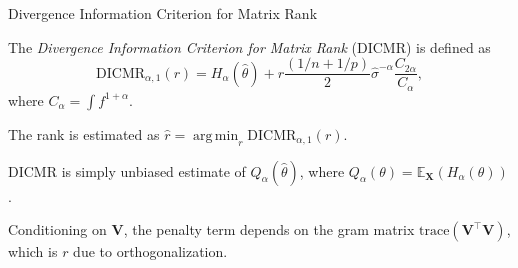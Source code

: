 \documentclass{beamer}
\newcommand{\E}{\mathbb{E}}
\newcommand{\tr}{^\top}
\newcommand{\trace}{\mathrm{trace}}
\newcommand{\bb}[1]{\boldsymbol{#1}}
\newcommand{\bbhat}[1]{\hat{\boldsymbol{#1}}}
\DeclareMathOperator*{\argmin}{arg\,min}
\newcommand{\blue}[1]{\textcolor{blue}{#1}}
\begin{document}


\begin{frame}{Divergence Information Criterion for Matrix Rank}
    \small
    \begin{definition}
        The \emph{Divergence Information Criterion for Matrix Rank} (DICMR) is defined as
        \begin{equation*}
            \mathrm{DICMR}_{\alpha,1}(r) = H_\alpha(\hat{\theta}) + r \dfrac{(1/n+1/p)}{2}\hat{\sigma}^{-\alpha}\dfrac{C_{2\alpha}}{C_\alpha},
        \end{equation*}
        where $C_\alpha = \int f^{1+\alpha}$.
    \end{definition}

    \vspace*{0.5em}
    The rank is estimated as $\widehat{r} = \argmin_r \mathrm{DICMR}_{\alpha,1}(r)$.

    \pause
    \vspace*{0.5em}
    DICMR is simply unbiased estimate of $Q_\alpha(\widehat{\theta})$, where $Q_\alpha(\theta) = \mathbb{E}_{\bb{X}}(H_\alpha(\theta))$. 

    Conditioning on $\bb{V}$, the penalty term depends on the gram matrix $\trace (\bb{V}\tr \bb{V})$, which is $r$ due to orthogonalization. 
\end{frame}
\end{document}
